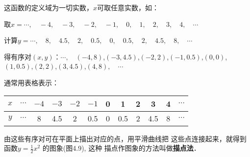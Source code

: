 \begin{solution}
这函数的定义域为一切实数，$x$可取任意实数，如：

取$x=\cdots,\quad -4,\quad -3,\quad -2,\quad -1,\quad 0,\quad 1,\quad 2,\quad 3,\quad 4,\quad \cdots$

计算$y=\cdots,\quad 8,\quad 4.5,\quad 2,\quad 0.5,\quad 0,\quad 0.5,\quad 2,\quad 4.5,\quad 8,\quad \cdots$

得有序对$(x,y)$：$\cdots,\quad (-4,8)$,\quad  $(-3,4.5)$,\quad  $(-2,2)$,\quad  $(-1,0.5)$,\quad  $(0,0)$,\quad  $(1,0.5)$,\quad  $(2,2)$,\quad  $(3,4.5)$,\quad  $(4,8),\quad\cdots$


通常用表格表示：
\begin{center}
\begin{tabular}{c|ccccccccccc}
\hline
$x$ & $\cdots$  &  $-4$  &  $-3$  &  $-2 $ &  $-1$  &  0  &  1  &  2  &  3  &  4  &  $\cdots$\\
\hline
$y$ &$\cdots$  &  8  &  4.5  &  2  &  0.5  &  0  &  0.5  &  2  &  4.5  &  8  &  $\cdots$\\
\hline
\end{tabular}
\end{center}

由这些有序对可在平面上描出对应的点，用平滑曲线把
这些点连接起来，就得到函数$y=\frac{1}{2}x^2$
的图象(图4.9), 这种
描点作图象的方法叫做\textbf{描点法}．
\begin{figure}[htp]
    \centering
{}
    \caption{}
\end{figure}
\end{solution}

